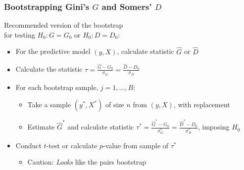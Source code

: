 \documentclass{beamer}
\begin{document}
\begin{frame}
\frametitle{Bootstrapping Gini's $G$ and Somers' $D$}

Recommended version of the bootstrap \\
for testing $H_0: G = G_0$ or $H_0: D = D_0$:
\begin{itemize}
    \item For the predictive model $(y, X)$, calculate statistic $\hat{G}$ or $\hat{D}$
    \item Calculate the statistic $\tau = \frac{\hat{G} - G_0}{\sigma_G} = \frac{\hat{D} - D_0}{\sigma_D}$
    \item For each bootstrap sample, $j = 1, \dots, B$:
    \begin{itemize}
        \item Take a sample $(y^{*}, X^{*})$ of size $n$ from $(y, X)$, with replacement
        \item Estimate $\hat{G}^{*}$ and calculate statistic $\tau^{*} = \frac{\hat{G}^{*} - G_0}{\sigma_G^{*}} = \frac{\hat{D}^{*} - D_0}{\sigma_D^{*}}$, imposing $H_0$
    \end{itemize}
    \item Conduct $t$-test or calculate $p$-value from sample of $\tau^{*}$
    \begin{itemize}
        \item Caution: \emph{Looks} like the pairs bootstrap
    \end{itemize}
\end{itemize}


\end{frame}

\end{document}
